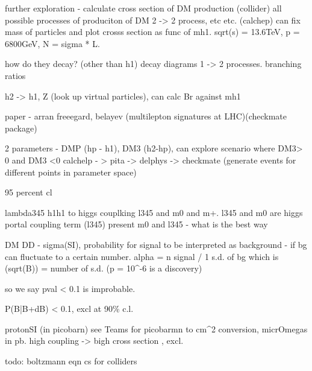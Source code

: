 \documentclass[11pt,a4paper]{article}
\begin{document}
further exploration - calculate cross section of DM production (collider)
all possible processes of produciton of DM 2 -> 2 process, etc etc. (calchep)
can fix mass of particles and plot crosss section as func of mh1.
sqrt(s) = 13.6TeV, p = 6800GeV, N = sigma * L. 

how do they decay? (other than h1)
decay diagrams 1 -> 2 processes.
branching ratios

h2 -> h1, Z (look up virtual particles), can calc Br against mh1

paper - arran freeegard, belayev (multilepton signatures at LHC)(checkmate package)

2 parameters - DMP (hp - h1), DM3 (h2-hp), can explore scenario where DM3> 0 and DM3 <0
calchelp - > pita -> delphys -> checkmate (generate events for different points in parameter space)

95 percent cl

lambda345 h1h1 to higgs couplking
l345 and m0 and m+. l345 and m0 are higgs portal coupling term (l345)
present m0 and l345 - what is the best way

DM DD - sigma(SI), probability for signal to be interpreted as background - if bg can fluctuate to a certain number.
alpha = n signal / 1 s.d. of bg which is (sqrt(B)) = number of s.d. (p = 10^-6 is a discovery)

so we say pval < 0.1 is improbable.

P(B|B+dB) < 0.1, excl at 90\% c.l.

protonSI (in picobarn) see Teams for picobarmn to cm^2 conversion, micrOmegas in pb. high coupling -> bigh cross section , excl. 

todo:
boltzmann eqn
cs for colliders
\end{document}
